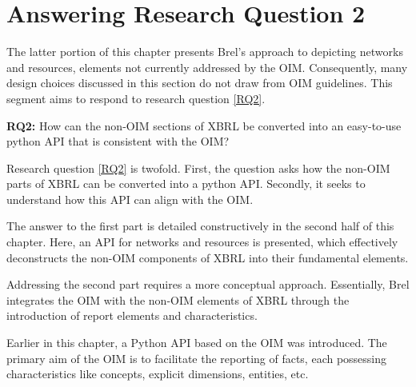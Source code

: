 \section{Answering Research Question 2}
\label{sec:answer_research_question_2}

The latter portion of this chapter presents Brel's approach to depicting networks and resources,
elements not currently addressed by the OIM.
Consequently, many design choices discussed in this section do not draw from OIM guidelines.
This segment aims to respond to research question \ref{RQ2}.

\begin{displayquote}
    \textbf{RQ2:} How can the non-OIM sections of XBRL be converted into an easy-to-use python API that is consistent with the OIM?
\end{displayquote}

Research question \ref{RQ2} is twofold.
First, the question asks how the non-OIM parts of XBRL can be converted into a python API.
Secondly, it seeks to understand how this API can align with the OIM.

The answer to the first part is detailed constructively in the second half of this chapter. 
Here, an API for networks and resources is presented, which effectively deconstructs the non-OIM components of XBRL into their fundamental elements.

Addressing the second part requires a more conceptual approach. 
Essentially, Brel integrates the OIM with the non-OIM elements of XBRL through the introduction of report elements and characteristics.

Earlier in this chapter, a Python API based on the OIM was introduced. 
The primary aim of the OIM is to facilitate the reporting of facts, each possessing characteristics like concepts, explicit dimensions, entities, etc.

